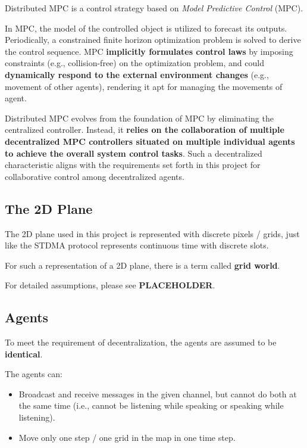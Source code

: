 Distributed MPC is a control strategy based on \textit{Model Predictive Control} (MPC).

In MPC, the model of the controlled object is utilized to forecast its outputs. Periodically, a constrained finite horizon optimization problem is solved to derive the control sequence.
MPC \textbf{implicitly formulates control laws} by imposing constraints (e.g., collision-free) on the optimization problem, and could \textbf{dynamically respond to the external environment changes} (e.g., movement of other agents), rendering it apt for managing the movements of agent.

Distributed MPC evolves from the foundation of MPC by eliminating the centralized controller. Instead, it \textbf{relies on the collaboration of multiple decentralized MPC controllers situated on multiple individual agents to achieve the overall system control tasks}. Such a decentralized characteristic aligns with the requirements set forth in this project for collaborative control among decentralized agents.

\subsection{The 2D Plane}

The 2D plane used in this project is represented with discrete pixels / grids, just like the STDMA protocol represents continuous time with discrete slots.

For such a representation of a 2D plane, there is a term called \textbf{grid world}\cite{GridWorld}.

For detailed assumptions, please see \textbf{PLACEHOLDER}.

\subsection{Agents}

To meet the requirement of decentralization, the agents are assumed to be \textbf{identical}.

The agents can:
\begin{itemize}
    \item Broadcast and receive messages in the given channel, but cannot do both at the same time (i.e., cannot be listening while speaking or speaking while listening).
    \item Move only one step / one grid in the map in one time step.
\end{itemize}

